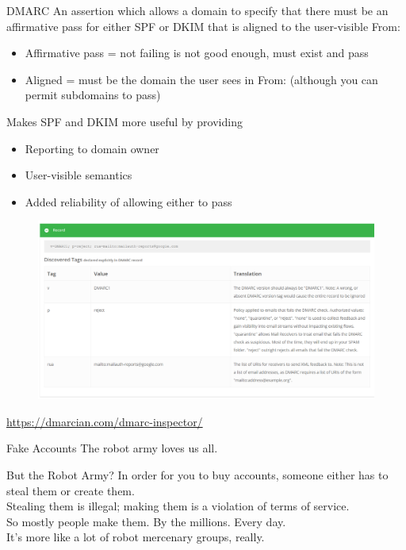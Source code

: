 \documentclass[nobackground,dvipsnames,table,aspectratio=169]{beamer}
\begin{document}
\begin{frame}{DMARC}
    An assertion which allows a domain to specify that there must be an affirmative pass for either SPF or DKIM that is aligned to the user-visible From:
    \begin{itemize}
        \item Affirmative pass = not failing is not good enough, must exist and pass
        \item Aligned = must be the domain the user sees in From: (although you can permit subdomains to pass)
    \end{itemize}
    Makes SPF and DKIM more useful by providing
    \begin{itemize}
        \item Reporting to domain owner
        \item User-visible semantics
        \item Added reliability of allowing either to pass
    \end{itemize}
\end{frame}

\begin{frame}{}
    \thispagestyle{empty}
    \begin{figure}
        \centering
        \includegraphics[width=\textwidth]{dmarc-discovered}
    \end{figure}
    \url{https://dmarcian.com/dmarc-inspector/}
\end{frame}

\begin{frame}{Fake Accounts}
    The robot army loves us all.
\end{frame}

\begin{frame}{But the Robot Army?}
    In order for you to buy accounts, someone either has to steal them or create them.\\
    Stealing them is illegal; making them is a violation of terms of service.\\
    So mostly people make them. By the millions. Every day.\\
    It’s more like a lot of robot mercenary groups, really. 
\end{frame}
\end{document}
